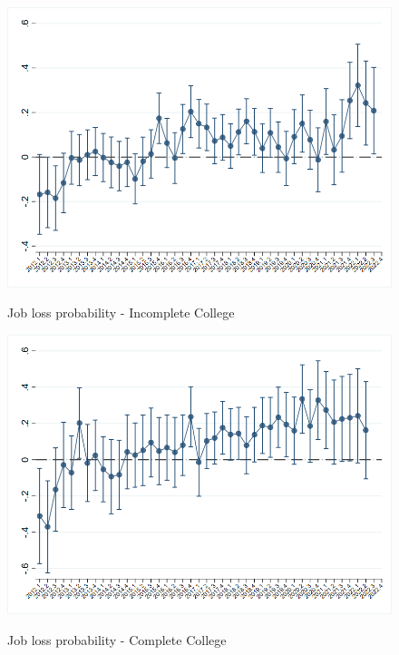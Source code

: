 \documentclass[a4paper]{article}
\begin{document}
\begin{figure}[hb]
  \centering
  \caption{Job loss probability - Incomplete College }
  \includegraphics[width=0.85\linewidth]{../analysis/output/graph/_graph_regression_job_loss_determinants_educ3.png}
  \label{fig:_graph_regression_job_loss_determinants_educ3}
\end{figure}


\begin{figure}[hb]
  \centering
  \caption{Job loss probability - Complete College}
  \includegraphics[width=0.85\linewidth]{../analysis/output/graph/_graph_regression_job_loss_determinants_educ4.png}
  \label{fig:_graph_regression_job_loss_determinants_educ4}
\end{figure}
\end{document}
